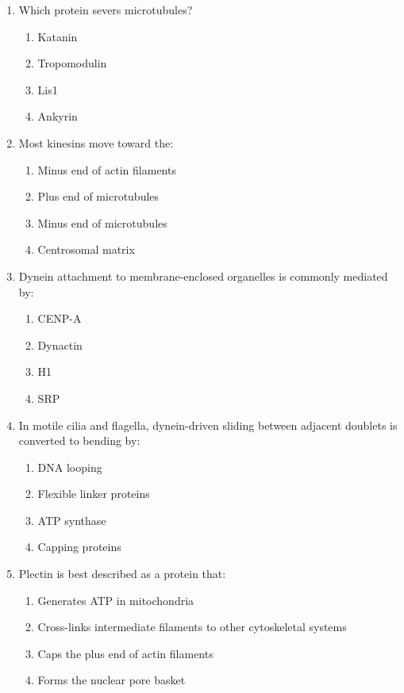 \documentclass[12pt,fontset=none]{ctexart}
\begin{document}
\begin{enumerate}
\item Which protein severs microtubules?
\begin{enumerate}[label=\alph*.]
\item Katanin
\item Tropomodulin
\item Lis1
\item Ankyrin
\end{enumerate}

\item Most kinesins move toward the:
\begin{enumerate}[label=\alph*.]
\item Minus end of actin filaments
\item Plus end of microtubules
\item Minus end of microtubules
\item Centrosomal matrix
\end{enumerate}

\item Dynein attachment to membrane-enclosed organelles is commonly mediated by:
\begin{enumerate}[label=\alph*.]
\item CENP-A
\item Dynactin
\item H1
\item SRP
\end{enumerate}

\item In motile cilia and flagella, dynein-driven sliding between adjacent doublets is converted to bending by:
\begin{enumerate}[label=\alph*.]
\item DNA looping
\item Flexible linker proteins
\item ATP synthase
\item Capping proteins
\end{enumerate}

\item Plectin is best described as a protein that:
\begin{enumerate}[label=\alph*.]
\item Generates ATP in mitochondria
\item Cross-links intermediate filaments to other cytoskeletal systems
\item Caps the plus end of actin filaments
\item Forms the nuclear pore basket
\end{enumerate}


\end{enumerate}
\end{document}
